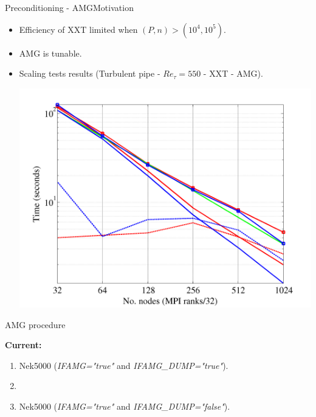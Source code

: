 \documentclass[usenames,dvipsnames,svgnames,9pt]{beamer}
\begin{document}
\begin{frame}{Preconditioning - AMG}{Motivation}
\begin{itemize}
\item Efficiency of XXT limited when $(P,n) > (10^4, 10^5)$.
\item AMG is tunable.
\item Scaling tests results (Turbulent pipe - $Re_{\tau} = 550$ - {\color{red} XXT} - {\color{blue} AMG}).

\centering
\includegraphics[width=0.7\linewidth]{BeskowReTau550.png}
\end{itemize}

\end{frame}

\begin{frame}{AMG procedure}

\textbf{Current:}
\begin{enumerate}
\item Nek5000 (\textit{IFAMG="true"} and \textit{IFAMG\_DUMP="true"}).
\vspace{3mm}
\item {} 
\vspace{3mm}
\item Nek5000 (\textit{IFAMG="true"} and \textit{IFAMG\_DUMP="false"}).
\end{enumerate}

\vspace{4mm}


\vspace{4mm}


\end{frame}
\end{document}
